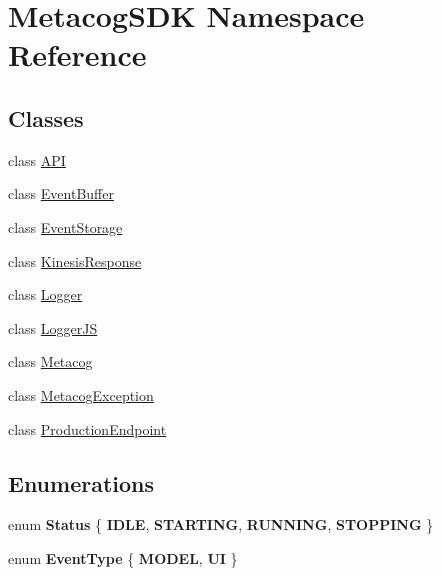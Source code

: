 \hypertarget{namespaceMetacogSDK}{}\section{Metacog\+S\+DK Namespace Reference}
\label{namespaceMetacogSDK}
\subsection*{Classes}
\begin{DoxyCompactItemize}
\item 
class \hyperlink{classMetacogSDK_1_1API}{A\+PI}
\item 
class \hyperlink{classMetacogSDK_1_1EventBuffer}{Event\+Buffer}
\item 
class \hyperlink{classMetacogSDK_1_1EventStorage}{Event\+Storage}
\item 
class \hyperlink{classMetacogSDK_1_1KinesisResponse}{Kinesis\+Response}
\item 
class \hyperlink{classMetacogSDK_1_1Logger}{Logger}
\item 
class \hyperlink{classMetacogSDK_1_1LoggerJS}{Logger\+JS}
\item 
class \hyperlink{classMetacogSDK_1_1Metacog}{Metacog}
\item 
class \hyperlink{classMetacogSDK_1_1MetacogException}{Metacog\+Exception}
\item 
class \hyperlink{classMetacogSDK_1_1ProductionEndpoint}{Production\+Endpoint}
\end{DoxyCompactItemize}
\subsection*{Enumerations}
\begin{DoxyCompactItemize}
\item 
enum {\bfseries Status} \{ {\bfseries I\+D\+LE}, 
{\bfseries S\+T\+A\+R\+T\+I\+NG}, 
{\bfseries R\+U\+N\+N\+I\+NG}, 
{\bfseries S\+T\+O\+P\+P\+I\+NG}
 \}\hypertarget{namespaceMetacogSDK_adb09f0e6c9abe254160c91be5ac0c9b1}{}\label{namespaceMetacogSDK_adb09f0e6c9abe254160c91be5ac0c9b1}

\item 
enum {\bfseries Event\+Type} \{ {\bfseries M\+O\+D\+EL}, 
{\bfseries UI}
 \}\hypertarget{namespaceMetacogSDK_a9a46be6b2e98a6ae7460c93faf69728e}{}\label{namespaceMetacogSDK_a9a46be6b2e98a6ae7460c93faf69728e}

\end{DoxyCompactItemize}
